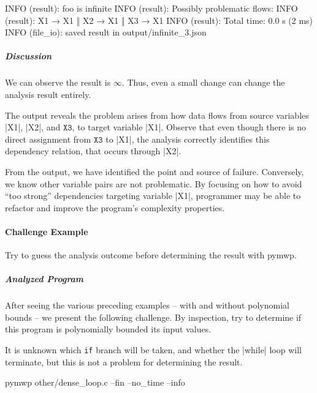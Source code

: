 \begin{outlisting}[label={lst:ex4-output}]
INFO (result): foo is infinite
INFO (result): Possibly problematic flows:
INFO (result): X1 → X1 ‖ X2 → X1 ‖ X3 → X1
INFO (result): Total time: 0.0 s (2 ms)
INFO (file_io): saved result in output/infinite_3.json
\end{outlisting}

\subparagraph*{Discussion}

We can observe the result is \(\infty\).
Thus, even a small change can change the analysis result entirely.

The output reveals the problem arises from how data flows from source variables \pr|X1|, \pr|X2|, and \(\texttt{X3}\), to target variable \pr|X1|.
Observe that even though there is no direct assignment from \(\texttt{X3}\) to \pr|X1|, the analysis correctly identifies this dependency relation, that occurs through \pr|X2|.

From the output, we have identified the point and source of failure.
Conversely, we know other variable pairs are not problematic.
By focusing on how to avoid \enquote{too strong} dependencies targeting variable \pr|X1|, programmer may be able to refactor and improve the program's complexity properties.

\paragraph{Challenge Example}\label{challenge-example}
Try to guess the analysis outcome before determining the result with pymwp.

\subparagraph*{Analyzed Program}\mbox{}

\begin{minipage}{\textwidth}

\end{minipage}

After seeing the various preceding examples -- with and without polynomial bounds -- we present the following challenge.
By inspection, try to determine if this program is polynomially bounded \wrt its input values.

It is unknown which \texttt{if} branch will be taken, and whether the \pr|while| loop will terminate, but this is not a problem for determining the result.

\begin{cmdlisting}[label={lst:ex5-run-cmd}]
pymwp other/dense_loop.c --fin --no_time --info
\end{cmdlisting}

